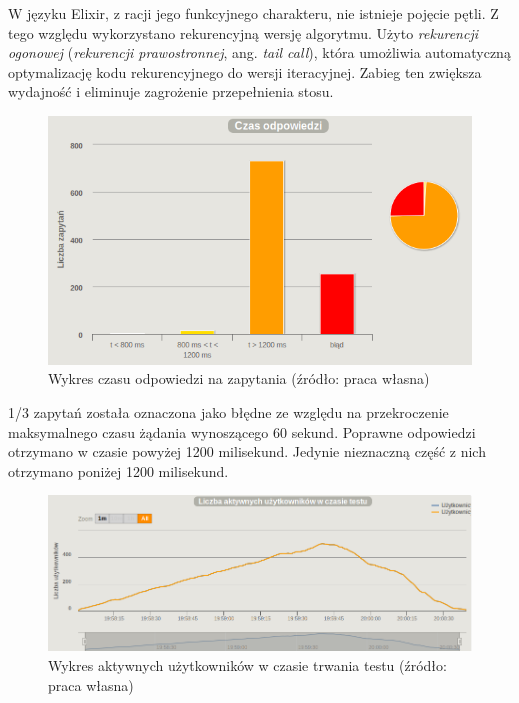\documentclass[12pt,twoside]{article}
\begin{document}
W języku Elixir, z racji jego funkcyjnego charakteru, nie istnieje
pojęcie pętli. Z tego względu wykorzystano rekurencyjną wersję
algorytmu. Użyto \emph{rekurencji ogonowej} (\emph{rekurencji
prawostronnej}, ang. \emph{tail call}), która umożliwia automatyczną
optymalizację kodu rekurencyjnego do wersji iteracyjnej. Zabieg ten
zwiększa wydajność i eliminuje zagrożenie przepełnienia stosu.

\begin{figure}[htbp]
\centering
\includegraphics[resolution=150]{test_results/elixir/fibonacci/screenshots/response_times.png}
\caption{Wykres czasu odpowiedzi na zapytania (źródło: praca własna)}
\end{figure}

1/3 zapytań została oznaczona jako błędne ze względu na przekroczenie
maksymalnego czasu żądania wynoszącego 60 sekund. Poprawne odpowiedzi
otrzymano w czasie powyżej 1200 milisekund. Jedynie nieznaczną część z
nich otrzymano poniżej 1200 milisekund.

\begin{figure}[htbp]
\centering
\includegraphics[resolution=150]{test_results/elixir/fibonacci/screenshots/active_users.png}
\caption{Wykres aktywnych użytkowników w czasie trwania testu (źródło: praca własna)}
\end{figure}
\end{document}
